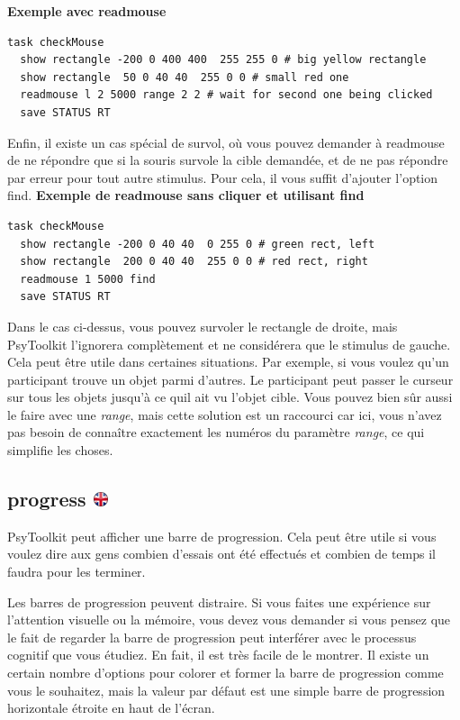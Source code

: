 \documentclass[
]{book}
\begin{document}
\textbf{Exemple avec readmouse}

\begin{verbatim}
task checkMouse
  show rectangle -200 0 400 400  255 255 0 # big yellow rectangle
  show rectangle  50 0 40 40  255 0 0 # small red one
  readmouse l 2 5000 range 2 2 # wait for second one being clicked
  save STATUS RT
\end{verbatim}

Enfin, il existe un cas spécial de survol, où vous pouvez demander à readmouse de ne répondre que si la souris survole la cible demandée, et de ne pas répondre par erreur pour tout autre stimulus. Pour cela, il vous suffit d'ajouter l'option find.
\textbf{Exemple de readmouse sans cliquer et utilisant find}

\begin{verbatim}
task checkMouse
  show rectangle -200 0 40 40  0 255 0 # green rect, left
  show rectangle  200 0 40 40  255 0 0 # red rect, right
  readmouse 1 5000 find
  save STATUS RT
\end{verbatim}

Dans le cas ci-dessus, vous pouvez survoler le rectangle de droite, mais PsyToolkit l'ignorera complètement et ne considérera que le stimulus de gauche. Cela peut être utile dans certaines situations. Par exemple, si vous voulez qu'un participant trouve un objet parmi d'autres. Le participant peut passer le curseur sur tous les objets jusqu'à ce quil ait vu l'objet cible. Vous pouvez bien sûr aussi le faire avec une \emph{range}, mais cette solution est un raccourci car ici, vous n'avez pas besoin de connaître exactement les numéros du paramètre \emph{range}, ce qui simplifie les choses.

\hypertarget{progress}{%
\subsection[progress ]{\texorpdfstring{progress \href{https://www.psytoolkit.org/doc3.2.0/syntax.html\#task-progress}{\protect\includegraphics{img/ukflag.png}}}{progress }}\label{progress}}

PsyToolkit peut afficher une barre de progression. Cela peut être utile si vous voulez dire aux gens combien d'essais ont été effectués et combien de temps il faudra pour les terminer.

Les barres de progression peuvent distraire. Si vous faites une expérience sur l'attention visuelle ou la mémoire, vous devez vous demander si vous pensez que le fait de regarder la barre de progression peut interférer avec le processus cognitif que vous étudiez.
En fait, il est très facile de le montrer. Il existe un certain nombre d'options pour colorer et former la barre de progression comme vous le souhaitez, mais la valeur par défaut est une simple barre de progression horizontale étroite en haut de l'écran.
\end{document}
